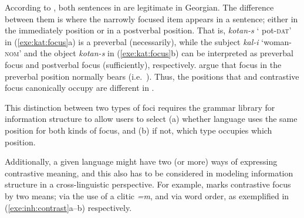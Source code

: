 

\noindent According to \citeauthor{skopeteas:fanselow:10}, both
sentences in  are legitimate in Georgian. The
difference between them is where the narrowly focused item appears in
a sentence; either in the immediately  position or in a
postverbal position. That is, \textit{kotan-s} ` pot-\textsc{dat}' in
(\ref{exe:kat:focus}a) is a preverbal  (necessarily), while the
subject \textit{kal-i} `woman-\textsc{nom}' and the object
\textit{kotan-s} in (\ref{exe:kat:focus}b) can be interpreted as
preverbal focus and postverbal focus (sufficiently), respectively.
\citeauthor{skopeteas:fanselow:10} argue that focus in the preverbal
position normally bears  (i.e.\ ).
Thus, the positions that  and contrastive
focus canonically occupy are different in .

This distinction between two types of foci requires the grammar
library for information structure to allow users to select (a) whether
language uses the same position for both kinds of focus, and (b) if
not, which type occupies which position.


Additionally, a given language might have two (or more) ways of
expressing contrastive meaning, and this also has to be considered in
modeling information structure in a cross-linguistic perspective.  For
example,  marks contrastive focus by two means; via the
use of a clitic \textit{=m}, and via word order, as exemplified in
(\ref{exe:inh:contrast}a--b) respectively.





